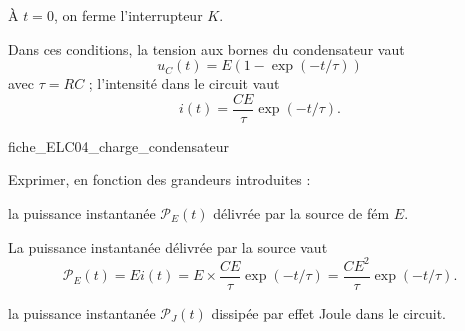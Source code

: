 À $t=0$, on ferme l'interrupteur $K$.

Dans ces conditions, la tension aux bornes du condensateur vaut 
\[
u_C(t)=E(1-\exp(-t/\tau))
\]
 avec $\tau=RC$ ; l'intensité dans le circuit vaut 
 \[
 i(t)=\frac{CE}{\tau}\exp(-t/\tau).
 \]


                                \initialisationPartieDroite %
\begin{center}
{fiche_ELC04_charge_condensateur}
\end{center}
                               \finalisationDuPartageDePage %



\debutEntrainement

\bigskip

Exprimer, en fonction des grandeurs introduites :


\begin{enonce}
la puissance instantanée $\mathcal{P}_E(t)$ délivrée par la source de fém $E$.
\end{enonce}


\begin{corrige}
La puissance instantanée délivrée par la source vaut 
\[
\mathcal{P}_E(t)=Ei(t)=E\times \dfrac{CE}{\tau}\exp(-t/\tau)=\frac{CE^2}{\tau}\exp(-t/\tau).
\]
\end{corrige}




\begin{enonce}
la puissance instantanée $\mathcal{P}_J(t)$ dissipée par effet Joule dans le circuit.
\end{enonce}

